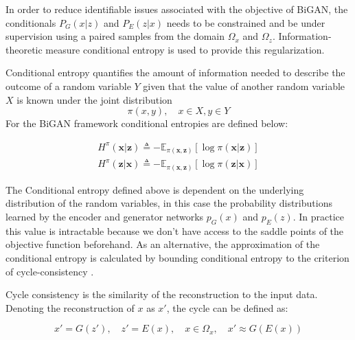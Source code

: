 In order to reduce identifiable issues associated with the objective of BiGAN, the
conditionals $P_{G}(x|z)$ and $P_{E}(z|x)$ needs to be constrained and be under supervision using a
paired samples from the domain $\Omega_{x}$ and $\Omega_{z}$. Information-theoretic measure
conditional entropy is used to provide this regularization. 

Conditional entropy quantifies the amount of information needed to describe the outcome of a random variable 
$Y$ given that the value of another random variable $X$ is known \cite{Cover:2006:EIT:1146355}  under the joint distribution 
$$
\pi(x ,y ) ,\quad x \in X , y \in Y
$$ 
For the BiGAN framework conditional entropies are defined below:

\begin{align}
    H^{\pi}(\boldsymbol{x} | \boldsymbol{z}) \triangleq-\mathbb{E}_{\pi(\boldsymbol{x}, \boldsymbol{z})}[\log \pi(\boldsymbol{x} | \boldsymbol{z})] \\[5pt]
    H^{\pi}(\boldsymbol{z} | \boldsymbol{x}) \triangleq-\mathbb{E}_{\pi(\boldsymbol{x}, \boldsymbol{z})}[\log \pi(\boldsymbol{z} | \boldsymbol{x})] 
\end{align}

The Conditional entropy defined above is dependent on the underlying distribution of the random
variables, in this case the probability distributions learned by the encoder and generator networks $p_{G}(x)$ and
$p_{E}(z)$. In practice this value is intractable because we don't have access to the saddle points
of the objective function beforehand. As an alternative, the approximation of the conditional
entropy is calculated by bounding conditional entropy to the criterion of cycle-consistency \cite{Zhu2017UnpairedIT}.

Cycle consistency is the similarity of the reconstruction to the input data. Denoting the
reconstruction of $x$ as $x'$, the cycle can be defined as: 

\begin{equation}
  x' = G(z'), \quad z' = E(x),\quad x \in \Omega_{x},\quad x' \approx G(E(x)) 
\end{equation}


